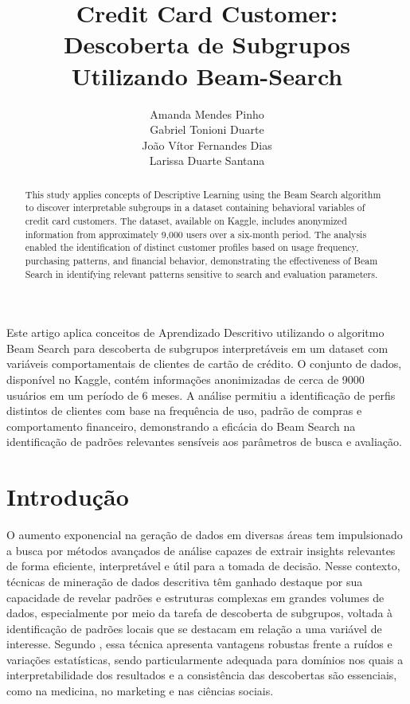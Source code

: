\documentclass[12pt]{article}
\title{
    Credit Card Customer: \\
    Descoberta de Subgrupos Utilizando Beam-Search
}
\author{
  Amanda Mendes Pinho\inst{1}\\
  Gabriel Tonioni Duarte\inst{2}\\
  João Vítor Fernandes Dias\inst{2}\\
  Larissa Duarte Santana\inst{2}
}
\begin{document}
\maketitle

\hspace{0.2em}

\begin{abstract}
    This study applies concepts of Descriptive Learning using the Beam Search algorithm to discover interpretable subgroups in a dataset containing behavioral variables of credit card customers. The dataset, available on Kaggle, includes anonymized information from approximately 9,000 users over a six-month period. The analysis enabled the identification of distinct customer profiles based on usage frequency, purchasing patterns, and financial behavior, demonstrating the effectiveness of Beam Search in identifying relevant patterns sensitive to search and evaluation parameters.
\end{abstract}

\begin{resumo}
    Este artigo aplica conceitos de Aprendizado Descritivo utilizando o algoritmo Beam Search para descoberta de subgrupos interpretáveis em um dataset com variáveis comportamentais de clientes de cartão de crédito. O conjunto de dados, disponível no Kaggle, contém informações anonimizadas de cerca de 9000 usuários em um período de 6 meses. A análise permitiu a identificação de perfis distintos de clientes com base na frequência de uso, padrão de compras e comportamento financeiro, demonstrando a eficácia do Beam Search na identificação de padrões relevantes sensíveis aos parâmetros de busca e avaliação.
\end{resumo}

\section{Introdução}

O aumento exponencial na geração de dados em diversas áreas tem impulsionado a busca por métodos avançados de análise capazes de extrair insights relevantes de forma eficiente, interpretável e útil para a tomada de decisão. Nesse contexto, técnicas de mineração de dados descritiva têm ganhado destaque por sua capacidade de revelar padrões e estruturas complexas em grandes volumes de dados, especialmente por meio da tarefa de descoberta de subgrupos, voltada à identificação de padrões locais que se destacam em relação a uma variável de interesse. Segundo \cite{proenca_22}, essa técnica apresenta vantagens robustas frente a ruídos e variações estatísticas, sendo particularmente adequada para domínios nos quais a interpretabilidade dos resultados e a consistência das descobertas são essenciais, como na medicina, no marketing e nas ciências sociais.
\end{document}
